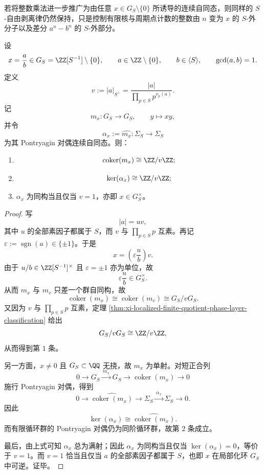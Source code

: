 若将整数乘法进一步推广为由任意 \(x\in G_S\setminus\{0\}\) 所诱导的连续自同态，则同样的 \(S\)-自由剥离律仍然保持，只是控制有限核与周期点计数的整数由 \(n\) 变为 \(x\) 的 \(S\)-外分子以及差分 \(a^n-b^n\) 的 \(S\)-外部分。

\begin{theorem}\label{thm:xi-localized-solenoid-endomorphism-kernel-cokernel-sfree-numerator}
设
\[
x=\frac{a}{b}\in G_S=\ZZ[S^{-1}]\setminus\{0\},
\qquad
a\in\ZZ\setminus\{0\},
\qquad
b\in\langle S\rangle,
\qquad
\gcd(a,b)=1.
\]
定义
\[
v:=|a|_{S^\perp}
=
\frac{|a|}{\prod_{p\in S}p^{v_p(a)}}.
\]
记
\[
m_x:G_S\to G_S,
\qquad
y\mapsto xy,
\]
并令
\[
\alpha_x:=\widehat{m_x}:\Sigma_S\to \Sigma_S
\]
为其 Pontryagin 对偶连续自同态。则：
\begin{enumerate}
  \item
  \[
  \operatorname{coker}(m_x)\cong \ZZ/v\ZZ;
  \]
  \item
  \[
  \ker(\alpha_x)\cong \ZZ/v\ZZ;
  \]
  \item \(\alpha_x\) 为同构当且仅当 \(v=1\)，亦即 \(x\in G_S^\times\)。
\end{enumerate}
\end{theorem}
\begin{proof}
写
\[
|a|=uv,
\]
其中 \(u\) 的全部素因子都属于 \(S\)，而 \(v\) 与 \(\prod_{p\in S}p\) 互素。再记 \(\varepsilon:=\operatorname{sgn}(a)\in\{\pm1\}\)。于是
\[
x=\left(\varepsilon\frac{u}{b}\right)v.
\]
由于 \(u/b\in \ZZ[S^{-1}]^\times\) 且 \(\varepsilon=\pm1\) 亦为单位，故
\[
\varepsilon\frac{u}{b}\in G_S^\times.
\]
从而 \(m_x\) 与 \(m_v\) 只差一个群自同构，故
\[
\operatorname{coker}(m_x)\cong \operatorname{coker}(m_v)\cong G_S/vG_S.
\]
又因为 \(v\) 与 \(\prod_{p\in S}p\) 互素，定理 \ref{thm:xi-localized-finite-quotient-phase-layer-classification} 给出
\[
G_S/vG_S\cong \ZZ/v\ZZ,
\]
从而得到第 \(1\) 条。

另一方面，\(x\neq 0\) 且 \(G_S\subset \QQ\) 无挠，故 \(m_x\) 为单射。对短正合列
\[
0\longrightarrow G_S\xrightarrow{\,m_x\,}G_S\longrightarrow \operatorname{coker}(m_x)\longrightarrow 0
\]
施行 Pontryagin 对偶，得到
\[
0\longrightarrow \widehat{\operatorname{coker}(m_x)}\longrightarrow \Sigma_S\xrightarrow{\,\alpha_x\,}\Sigma_S\longrightarrow 0.
\]
因此
\[
\ker(\alpha_x)\cong \widehat{\operatorname{coker}(m_x)}.
\]
而有限循环群的 Pontryagin 对偶仍为同阶循环群，故第 \(2\) 条成立。

最后，由上式可知 \(\alpha_x\) 总为满射；因此 \(\alpha_x\) 为同构当且仅当 \(\ker(\alpha_x)=0\)，等价于 \(v=1\)。而 \(v=1\) 恰当且仅当 \(a\) 的全部素因子都属于 \(S\)，也即 \(x\) 在局部化环 \(G_S\) 中可逆。证毕。
\end{proof}

